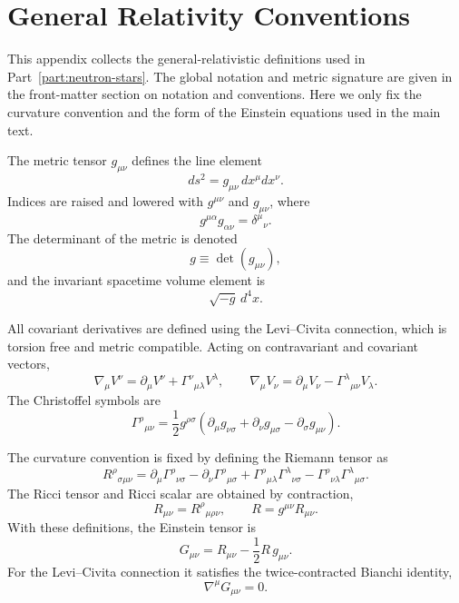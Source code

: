 \chapter{General Relativity Conventions}
\label{app:GR_basics}

This appendix collects the general-relativistic definitions used in
Part~\ref{part:neutron-stars}. The global notation and metric signature are
given in the front-matter section on notation and conventions. Here we only fix
the curvature convention and the form of the Einstein equations used in the
main text.

The metric tensor \(g_{\mu\nu}\) defines the line element
\begin{equation}
    ds^2 = g_{\mu\nu}\,dx^\mu dx^\nu .
\end{equation}
Indices are raised and lowered with \(g^{\mu\nu}\) and \(g_{\mu\nu}\), where
\[
    g^{\mu\alpha}g_{\alpha\nu}
    =
    \delta^\mu{}_\nu .
\]
The determinant of the metric is denoted
\[
    g \equiv \det(g_{\mu\nu}),
\]
and the invariant spacetime volume element is
\[
    \sqrt{-g}\,d^4x .
\]

All covariant derivatives are defined using the Levi--Civita connection, which
is torsion free and metric compatible. Acting on contravariant and covariant
vectors,
\begin{equation}
    \nabla_\mu V^\nu
    =
    \partial_\mu V^\nu
    +
    \Gamma^\nu{}_{\mu\lambda}V^\lambda,
    \qquad
    \nabla_\mu V_\nu
    =
    \partial_\mu V_\nu
    -
    \Gamma^\lambda{}_{\mu\nu}V_\lambda .
\end{equation}
The Christoffel symbols are
\begin{equation}
    \Gamma^\rho{}_{\mu\nu}
    =
    \frac{1}{2}g^{\rho\sigma}
    \left(
        \partial_\mu g_{\nu\sigma}
        +
        \partial_\nu g_{\mu\sigma}
        -
        \partial_\sigma g_{\mu\nu}
    \right).
    \label{eq:christoffel_def}
\end{equation}

The curvature convention is fixed by defining the Riemann tensor as
\begin{equation}
    R^\rho{}_{\sigma\mu\nu}
    =
    \partial_\mu \Gamma^\rho{}_{\nu\sigma}
    -
    \partial_\nu \Gamma^\rho{}_{\mu\sigma}
    +
    \Gamma^\rho{}_{\mu\lambda}\Gamma^\lambda{}_{\nu\sigma}
    -
    \Gamma^\rho{}_{\nu\lambda}\Gamma^\lambda{}_{\mu\sigma}.
    \label{eq:riemann_def}
\end{equation}
The Ricci tensor and Ricci scalar are obtained by contraction,
\begin{equation}
    R_{\mu\nu}
    =
    R^\rho{}_{\mu\rho\nu},
    \qquad
    R
    =
    g^{\mu\nu}R_{\mu\nu}.
    \label{eq:ricci_def}
\end{equation}
With these definitions, the Einstein tensor is
\begin{equation}
    G_{\mu\nu}
    =
    R_{\mu\nu}
    -
    \frac{1}{2}R\,g_{\mu\nu}.
    \label{eq:einstein_tensor_def}
\end{equation}
For the Levi--Civita connection it satisfies the twice-contracted Bianchi
identity,
\begin{equation}
    \nabla^\mu G_{\mu\nu}=0 .
\end{equation}

